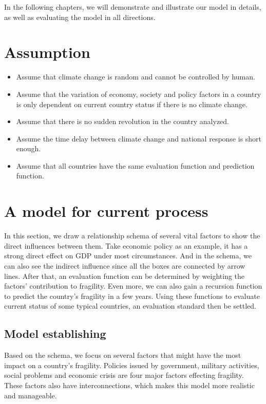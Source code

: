 \documentclass{mcmthesis}
\begin{document}
In the following chapters, we will demonstrate and illustrate our model in details, as well as evaluating the model in all directions.

\section{Assumption}

\begin{itemize}
\item Assume that climate change is random and cannot be controlled by human.

\item Assume that the variation of economy, society and policy factors in a country is only dependent on current country status if there is no climate change.

\item Assume that there is no sudden revolution in the country analyzed.

\item Assume the time delay between climate change and national response is short enough.

\item Assume that all countries have the same evaluation function and prediction function.

\end{itemize}

\section{A model for current process}
In this section, we draw a relationship schema of several vital factors to show the direct influences between them. Take economic policy as an example, it has a strong direct effect on GDP under most circumstances. And in the schema, we can also see the indirect influence since all the boxes are connected by arrow lines. After that, an evaluation function can be determined by weighting the factors’ contribution to fragility. Even more, we can also gain a recursion function to predict the country’s fragility in a few years. Using these functions to evaluate current status of some typical countries, an evaluation standard then be settled.
\subsection{Model establishing}
Based on the schema, we focus on several factors that might have the most impact on a country’s fragility. Policies issued by government, military activities, social problems and economic crisis are four major factors effecting fragility. These factors also have interconnections, which makes this model more realistic and manageable.
\end{document}

